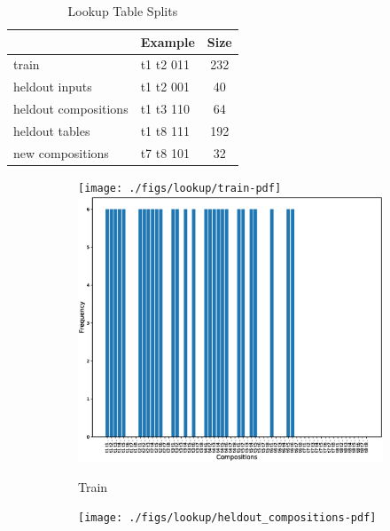 \begin{table}[ht]
	\centering
	\begin{tabular}{l|lc}
		& Example & Size\\
		\hline
		train & t1 t2 011 & 232 \\
		heldout inputs & t1 t2 001 & 40 \\
		heldout compositions & t1 t3 110 & 64 \\
		heldout tables & t1 t8 111 & 192 \\
		new compositions & t7 t8 101 & 32 \\
	\end{tabular}
	\caption{Lookup Table Splits}
	\label{lt:stats}
\end{table}


\begin{figure}[ht]
	\begin{subfigure}{0.5\linewidth}
		\ifpdf
		\texttt{[image: ./figs/lookup/train-pdf]}
		\else
		\includegraphics[width=0.95\linewidth]{./figs/lookup/train-eps}
		\fi
		\caption{Train}\label{fig:train_dist}
	\end{subfigure}
	\begin{subfigure}{0.5\linewidth}
		\ifpdf
		\texttt{[image: ./figs/lookup/heldout\_compositions-pdf]}
		\else

\end{subfigure}
\end{figure}
